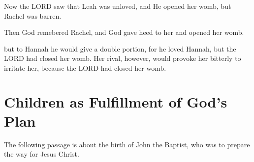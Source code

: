 \vspace{1\baselineskip}

\begin{scripture}[Genesis 29:31]
    Now the LORD saw that Leah was unloved, and He opened her womb, but Rachel was barren.
\end{scripture}

\vspace{1\baselineskip}

\begin{scripture}[Genesis 30:22]
    Then God remebered Rachel, and God gave heed to her and opened her womb.
\end{scripture}

\vspace{1\baselineskip}

\begin{scripture}[1 Samuel 1:5-6]
    but to Hannah he would give a double portion, for he loved Hannah, but the LORD had closed her womb.
    Her rival, however, would provoke her bitterly to irritate her, because the LORD had closed her womb.
\end{scripture}

\newpage
\section{Children as Fulfillment of God's Plan}

The following passage is about the birth of John the Baptist, who was to prepare the way for Jesus Christ.
\vspace{1\baselineskip}

